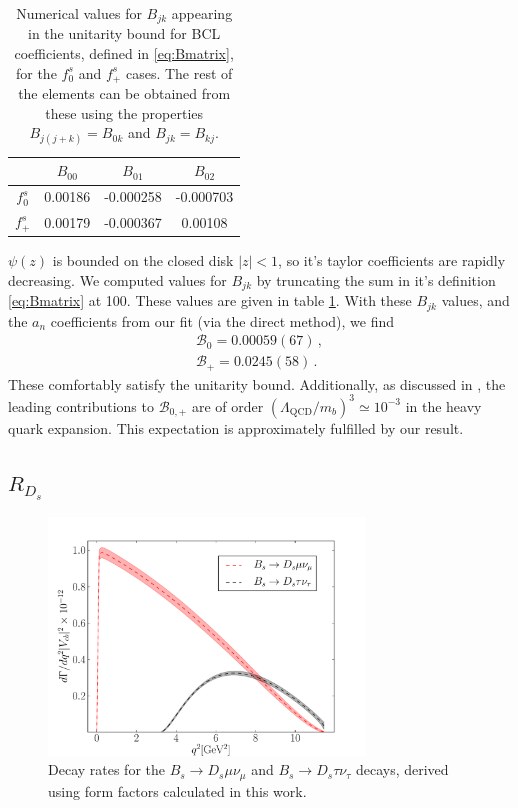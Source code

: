 \begin{table}[htb!]
  \begin{center}
    \begin{tabular}{c c c c}
      \hline
      & $B_{00}$ & $B_{01}$ & $B_{02}$ \\ [0.5ex]
      \hline
      $f^s_0$ & 0.00186 & -0.000258 & -0.000703 \\ [0.5ex]
      $f^s_+$ & 0.00179 & -0.000367 & 0.00108 \\ [0.5ex]
      \hline
    \end{tabular}
  \end{center}
  \caption{Numerical values for $B_{jk}$ appearing in the unitarity bound for BCL coefficients, defined in \eqref{eq:Bmatrix}, for the $f^s_0$ and $f^s_+$ cases. The rest of the elements can be obtained from these using the properties $B_{j(j+k)}=B_{0k}$ and $B_{jk}=B_{kj}$. \label{tab:Bmatrix}}
\end{table}

$\psi(z)$ is bounded on the closed disk $|z|<1$, so it's taylor coefficients are rapidly decreasing. We computed values for $B_{jk}$ by truncating the sum in it's definition \eqref{eq:Bmatrix} at 100. These values are given in table \ref{tab:Bmatrix}. With these $B_{jk}$ values, and the $a_n$ coefficients from our fit (via the direct method), we find
\begin{align}
  \nonumber
  \mathcal{B}_0 = 0.00059(67)\,,
  \\ \mathcal{B}_+ = 0.0245(58)\,.
  \nonumber
\end{align}
These comfortably satisfy the unitarity bound. Additionally, as discussed in \cite{BECHER200661}, the leading contributions to $\mathcal{B}_{0,+}$ are of order $(\Lambda_{\text{QCD}}/m_b)^3 \simeq 10^{-3}$ in the heavy quark expansion. This expectation is approximately fulfilled by our result.

\subsection{$R_{D_s}$}

\begin{figure}[htb!]
  \begin{center}
  \includegraphics[width=0.75\textwidth]{images/BsDs/direct/branchingfraction.pdf}
  \caption{Decay rates for the $B_s\to D_s\mu\nu_{\mu}$ and $B_s\to D_s\tau\nu_{\tau}$ decays, derived using form factors calculated in this work.}
  \end{center}
\end{figure}

